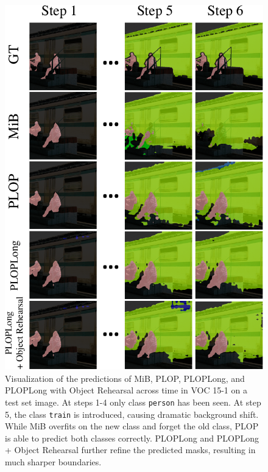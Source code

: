 \begin{figure}
    \centering
    \includegraphics[width=\linewidth]{images/seg/visualization_gt_shift2.pdf}
    \caption{Visualization of the predictions of MiB, PLOP, PLOPLong, and PLOPLong with Object
        Rehearsal across time in VOC 15-1 on a test set image. At steps 1-4 only class
        \texttt{person} has been seen. At step 5, the class \texttt{train} is introduced, causing
        dramatic background shift. While MiB overfits on the new class and forget the old class,
        PLOP is able to predict both classes correctly. PLOPLong and PLOPLong + Object Rehearsal
        further refine the predicted masks, resulting in much sharper boundaries.}
    \label{fig:seg_visualization_gt_shift}
\end{figure}

